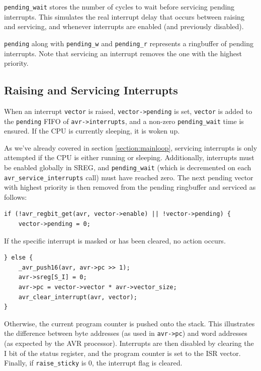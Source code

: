 \lstinline|pending_wait| stores the number of cycles to wait before servicing
pending interrupts. This simulates the real interrupt delay that occurs between
raising and servicing, and whenever interrupts are enabled
(and previously disabled).

\lstinline|pending| along with \lstinline|pending_w| and \lstinline|pending_r|
represents a ringbuffer of pending interrupts. Note that servicing an
interrupt removes the one with the highest priority.


\subsection{Raising and Servicing Interrupts}

When an interrupt \lstinline|vector| is raised, \lstinline|vector->pending| is
set, \lstinline|vector| is added to the \lstinline|pending| \ac{FIFO} of
\lstinline|avr->interrupts|, and a non-zero \lstinline|pending_wait| time is
ensured. If the \ac{CPU} is currently sleeping, it is woken up.

As we've already covered in section \ref{section:mainloop}, servicing interrupts is
only attempted if the \ac{CPU} is either running or sleeping. Additionally,
interrupts must be enabled globally in \ac{SREG}, and \lstinline|pending_wait|
(which is decremented on each \lstinline|avr_service_interrupts| call) must have
reached zero. The next pending vector with highest priority is then removed from
the pending ringbuffer and serviced as follows:

\begin{lstlisting}
if (!avr_regbit_get(avr, vector->enable) || !vector->pending) {
    vector->pending = 0;
\end{lstlisting}

If the specific interrupt is masked or has been cleared, no action occurs.

\begin{lstlisting}
} else {
    _avr_push16(avr, avr->pc >> 1);
    avr->sreg[S_I] = 0;
    avr->pc = vector->vector * avr->vector_size;
    avr_clear_interrupt(avr, vector);
}
\end{lstlisting}

Otherwise, the current program counter is pushed onto the stack. This illustrates
the difference between byte addresses (as used in \lstinline|avr->pc|) and
word addresses (as expected by the \ac{AVR} processor).
Interrupts are then disabled by clearing the I bit of the status register, and
the program counter is set to the \ac{ISR} vector. Finally, if
\lstinline|raise_sticky| is 0, the interrupt flag is cleared.

